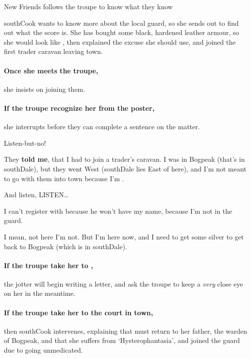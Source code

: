 {New Friends}%
{ follows the troupe to know what they know}%

\Gls{southCook} wants to know more about the local \gls{guard}, so she sends  out to find out what the score is.
She has bought  some black, hardened leather armour, so she would look like , then explained the excuse she should use, and  joined the first trader caravan leaving \gls{town}.

\paragraph{Once she meets the troupe,}
she insists on joining them.

\paragraph{If the troupe recognize her from the poster,}
she interrupts before they can complete a sentence on the matter.

\begin{exampletext}
  Listen-but-no!
  
  They \textbf {told me}, that I had to join a trader's caravan.
  I was in Bogpeak (that's in \gls{southDale}), but they went West (\gls{southDale} lies East of here), and I'm not meant to go with them into \gls{town} because I'm .
  
  And listen, LISTEN\ldots

  I can't register with  because he won't have my name, because I'm not in the \gls{guard}.

  I mean, not here I'm not.
  But I'm here now, and I need to get some silver to get back to Bogpeak (which is in \gls{southDale}).
\end{exampletext}

\paragraph{If the troupe take her to ,}
the \gls{jotter} will begin writing a letter, and ask the troupe to keep a \textit{very} close eye on her in the meantime.

\paragraph{If the troupe take her to the \gls{court} in \gls{town},}
then \gls{southCook} intervenes, explaining that  must return to her father, the \gls{warden} of Bogpeak, and that she suffers from `Hysterophantasia', and joined the \gls{guard} due to going unmedicated.

